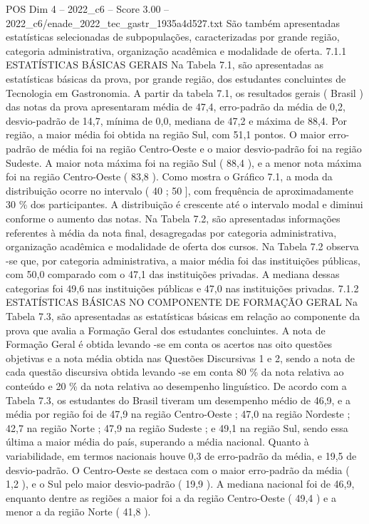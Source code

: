 \begin{textsample}{POS Dim 4 – 2022\_c6 – Score 3.00 – 2022\_c6/enade\_2022\_tec\_gastr\_1935a4d527.txt}
São também apresentadas estatísticas selecionadas de subpopulações, caracterizadas por grande região, categoria administrativa, organização acadêmica e modalidade de oferta. 7.1.1 ESTATÍSTICAS BÁSICAS GERAIS Na Tabela 7.1, são apresentadas as estatísticas básicas da prova, por grande região, dos estudantes concluintes de Tecnologia em Gastronomia.
A partir da tabela 7.1, os resultados gerais ( Brasil ) das notas da prova apresentaram média de 47,4, erro-padrão da média de 0,2, desvio-padrão de 14,7, mínima de 0,0, mediana de 47,2 e máxima de 88,4.
Por região, a maior média foi obtida na região Sul, com 51,1 pontos.
O maior erro-padrão de média foi na região Centro-Oeste e o maior desvio-padrão foi na região Sudeste.
A maior nota máxima foi na região Sul ( 88,4 ), e a menor nota máxima foi na região Centro-Oeste ( 83,8 ).
Como mostra o Gráfico 7.1, a moda da distribuição ocorre no intervalo ( 40 ; 50 ], com frequência de aproximadamente 30 \% dos participantes.
A distribuição é crescente até o intervalo modal e diminui conforme o aumento das notas.
Na Tabela 7.2, são apresentadas informações referentes à média da nota final, desagregadas por categoria administrativa, organização acadêmica e modalidade de oferta dos cursos.
Na Tabela 7.2 observa -se que, por categoria administrativa, a maior média foi das instituições públicas, com 50,0 comparado com o 47,1 das instituições privadas.
A mediana dessas categorias foi 49,6 nas instituições públicas e 47,0 nas instituições privadas. 7.1.2 ESTATÍSTICAS BÁSICAS NO COMPONENTE DE FORMAÇÃO GERAL Na Tabela 7.3, são apresentadas as estatísticas básicas em relação ao componente da prova que avalia a Formação Geral dos estudantes concluintes.
A nota de Formação Geral é obtida levando -se em conta os acertos nas oito questões objetivas e a nota média obtida nas Questões Discursivas 1 e 2, sendo a nota de cada questão discursiva obtida levando -se em conta 80 \% da nota relativa ao conteúdo e 20 \% da nota relativa ao desempenho linguístico.
De acordo com a Tabela 7.3, os estudantes do Brasil tiveram um desempenho médio de 46,9, e a média por região foi de 47,9 na região Centro-Oeste ; 47,0 na região Nordeste ; 42,7 na região Norte ; 47,9 na região Sudeste ; e 49,1 na região Sul, sendo essa última a maior média do país, superando a média nacional.
Quanto à variabilidade, em termos nacionais houve 0,3 de erro-padrão da média, e 19,5 de desvio-padrão.
O Centro-Oeste se destaca com o maior erro-padrão da média ( 1,2 ), e o Sul pelo maior desvio-padrão ( 19,9 ).
A mediana nacional foi de 46,9, enquanto dentre as regiões a maior foi a da região Centro-Oeste ( 49,4 ) e a menor a da região Norte ( 41,8 ).

\end{textsample}
